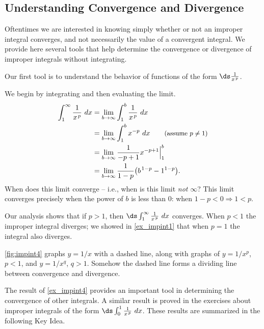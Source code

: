 \subsection*{Understanding Convergence and Divergence}

Oftentimes we are interested in knowing simply whether or not an improper integral converges, and not necessarily the value of a convergent integral. We provide here several tools that help determine the convergence or divergence of improper integrals without integrating.

Our first tool is to understand the behavior of functions of the form $\ds \frac1{x\hskip1pt ^p}$.

{We begin by integrating and then evaluating the limit.
\begin{align*}
	\int_1^\infty \frac1{x\hskip1pt ^p}\ dx
	&= \lim_{b\to\infty}\int_1^b\frac1{x\hskip1pt ^p}\ dx\\
	&= \lim_{b\to\infty}\int_1^b x^{-p}\ dx \qquad \text{\small (assume $p\neq 1$)}\\
	&= \lim_{b\to\infty} \frac{1}{-p+1}x^{-p+1}\Big|_1^b\\
	&= \lim_{b\to\infty} \frac{1}{1-p}\big(b\hskip1pt^{1-p}-1^{1-p}\big).\\
\end{align*}
When does this limit converge -- i.e., when is this limit \textit{not} $\infty$? This limit converges precisely when the power of $b$ is less than 0: when $1-p<0 \Rightarrow 1<p$. 


Our analysis shows that if $p>1$, then $\ds\int_1^\infty \frac1{x\hskip1pt ^p}\ dx $ converges. When $p<1$ the improper integral diverges; we showed in \autoref{ex_impint1} that when $p=1$ the integral also diverges. 

\autoref{fig:impint4} graphs $y=1/x$ with a dashed line, along with graphs of $y=1/x^p$, $p<1$, and $y=1/x^q$, $q>1$. Somehow the dashed line forms a dividing line between convergence and divergence. %
}

The result of \autoref{ex_impint4} provides an important tool in determining the convergence of other integrals. A similar result is proved in the exercises about improper integrals of the form $\ds \int_0^1\frac1{x\hskip1pt ^p}\ dx$. These results are summarized in the following Key Idea.

